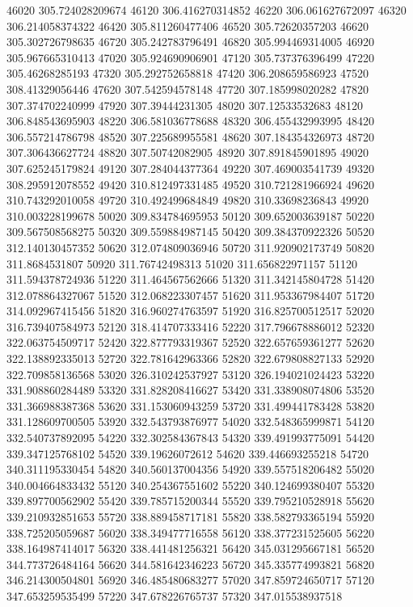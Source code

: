 {46020 305.724028209674
46120 306.416270314852
46220 306.061627672097
46320 306.214058374322
46420 305.811260477406
46520 305.72620357203
46620 305.302726798635
46720 305.242783796491
46820 305.994469314005
46920 305.967665310413
47020 305.924690906901
47120 305.737376396499
47220 305.46268285193
47320 305.292752658818
47420 306.208659586923
47520 308.41329056446
47620 307.542594578148
47720 307.185998020282
47820 307.374702240999
47920 307.39444231305
48020 307.12533532683
48120 306.848543695903
48220 306.581036778688
48320 306.455432993995
48420 306.557214786798
48520 307.225689955581
48620 307.184354326973
48720 307.306436627724
48820 307.50742082905
48920 307.891845901895
49020 307.625245179824
49120 307.284044377364
49220 307.469003541739
49320 308.295912078552
49420 310.812497331485
49520 310.721281966924
49620 310.743292010058
49720 310.492499684849
49820 310.33698236843
49920 310.003228199678
50020 309.834784695953
50120 309.652003639187
50220 309.567508568275
50320 309.559884987145
50420 309.384370922326
50520 312.140130457352
50620 312.074809036946
50720 311.920902173749
50820 311.8684531807
50920 311.76742498313
51020 311.656822971157
51120 311.594378724936
51220 311.464567562666
51320 311.342145804728
51420 312.078864327067
51520 312.068223307457
51620 311.953367984407
51720 314.092967415456
51820 316.960274763597
51920 316.825700512517
52020 316.739407584973
52120 318.414707333416
52220 317.796678886012
52320 322.063754509717
52420 322.877793319367
52520 322.657659361277
52620 322.138892335013
52720 322.781642963366
52820 322.679808827133
52920 322.709858136568
53020 326.310242537927
53120 326.194021024423
53220 331.908860284489
53320 331.828208416627
53420 331.338908074806
53520 331.366988387368
53620 331.153060943259
53720 331.499441783428
53820 331.128609700505
53920 332.543793876977
54020 332.548365999871
54120 332.540737892095
54220 332.302584367843
54320 339.491993775091
54420 339.347125768102
54520 339.19626072612
54620 339.446693255218
54720 340.311195330454
54820 340.560137004356
54920 339.557518206482
55020 340.004664833432
55120 340.254367551602
55220 340.124699380407
55320 339.897700562902
55420 339.785715200344
55520 339.795210528918
55620 339.210932851653
55720 338.889458717181
55820 338.582793365194
55920 338.725205059687
56020 338.349477716558
56120 338.377231525605
56220 338.164987414017
56320 338.441481256321
56420 345.031295667181
56520 344.773726484164
56620 344.581642346223
56720 345.335774993821
56820 346.214300504801
56920 346.485480683277
57020 347.859724650717
57120 347.653259535499
57220 347.678226765737
57320 347.015538937518
}

